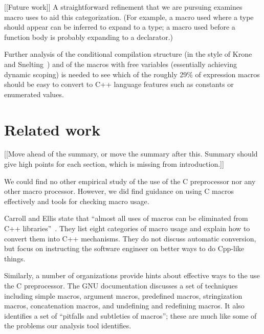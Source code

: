 \documentclass[10pt]{article}
\begin{document}
% 

[[Future work]]
  A
straightforward refinement that we are pursuing examines macro uses to aid
this categorization.  (For example, a macro used where a type should appear
can be inferred to expand to a type; a macro used before a function body is
probably expanding to a declarator.)

Further analysis of the conditional
compilation structure (in the style of Krone and Snelting~\cite{Krone94})
and of the macros with free variables (essentially achieving dynamic
scoping) is needed to see which of the roughly 29\% of expression macros
should be easy to convert to C++ language features such as constants or
enumerated values.


\section{Related work}
\label{sec:related}

[[Move ahead of the summary, or move the summary after this.  Summary
should give high points for each section, which is missing from
introduction.]]

We could find no other empirical study of the use of the C preprocessor nor
any other macro processor.  However, we did find guidance on using C macros
effectively and tools for checking macro usage.

Carroll and Ellis state that ``almost all uses of macros can be eliminated
from C++ libraries''~\cite[p.~146]{Carroll95}.  They list eight categories
of macro usage and explain how to convert them into C++ mechanisms.  They
do not discuss automatic conversion, but focus on instructing the software
engineer on better ways to do Cpp-like things.

Similarly, a number of organizations provide hints about effective ways to
the use the C preprocessor.  The GNU documentation discusses
a set of techniques including simple macros, argument macros, predefined
macros, stringization macros, concatenation macros, and undefining and
redefining macros.  It also identifies a set of ``pitfalls and subtleties
of macros''; these are much like some of the problems our analysis tool
identifies.
\end{document}
